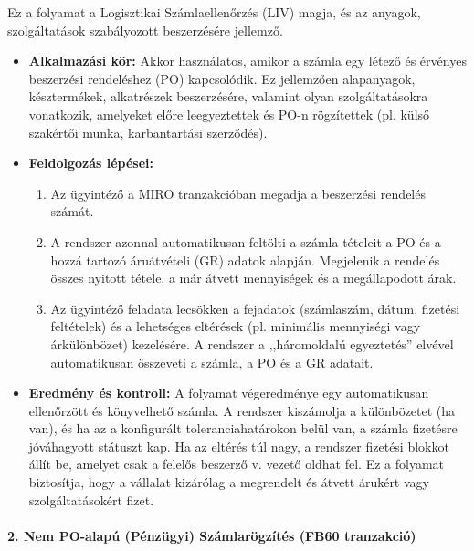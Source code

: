 Ez a folyamat a Logisztikai Számlaellenőrzés (LIV) magja, és az anyagok, szolgáltatások szabályozott beszerzésére jellemző.
\begin{itemize}
    \item \textbf{Alkalmazási kör:} Akkor használatos, amikor a számla egy létező és érvényes beszerzési rendeléshez (PO) kapcsolódik.
    Ez jellemzően alapanyagok, késztermékek, alkatrészek beszerzésére, valamint olyan szolgáltatásokra vonatkozik, amelyeket előre leegyeztettek és PO-n rögzítettek (pl. külső szakértői munka, karbantartási szerződés).
    \item \textbf{Feldolgozás lépései:}
        \begin{enumerate}
            \item Az ügyintéző a MIRO tranzakcióban megadja a beszerzési rendelés számát.
            \item A rendszer azonnal automatikusan feltölti a számla tételeit a PO és a hozzá tartozó áruátvételi (GR) adatok alapján.
            Megjelenik a rendelés összes nyitott tétele, a már átvett mennyiségek és a megállapodott árak.
            \item Az ügyintéző feladata lecsökken a fejadatok (számlaszám, dátum, fizetési feltételek) és a lehetséges eltérések (pl. minimális mennyiségi vagy árkülönbözet) kezelésére.
            A rendszer a ,,háromoldalú egyeztetés'' elvével automatikusan összeveti a számla, a PO és a GR adatait.
        \end{enumerate}
    \item \textbf{Eredmény és kontroll:} A folyamat végeredménye egy automatikusan ellenőrzött és könyvelhető számla.
    A rendszer kiszámolja a különbözetet (ha van), és ha az a konfigurált toleranciahatárokon belül van, a számla fizetésre jóváhagyott státuszt kap.
    Ha az eltérés túl nagy, a rendszer fizetési blokkot állít be, amelyet csak a felelős beszerző v. vezető oldhat fel.
    Ez a folyamat biztosítja, hogy a vállalat kizárólag a megrendelt és átvett árukért vagy szolgáltatásokért fizet.
\end{itemize}

\paragraph{2. Nem PO-alapú (Pénzügyi) Számlarögzítés (FB60 tranzakció) \cite{SAP-Non-PO-Invoices}}

